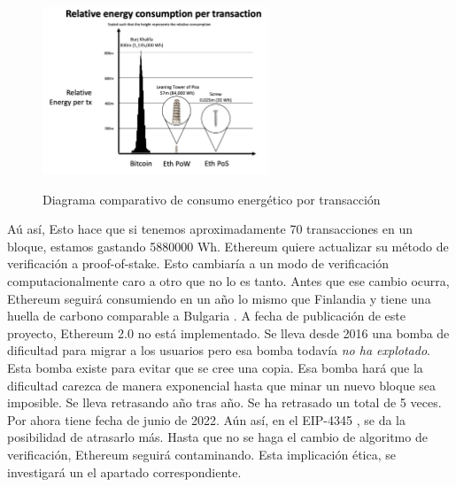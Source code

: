 \begin{figure}[h!]
    \centering
    \includegraphics[width=0.6\textwidth]{Figures/consumo.png}
    \caption{Diagrama comparativo de consumo energético por transacción}
    \label{fg:consumo}
    \cite{web:eth_energy}
\end{figure}
Aú así, Esto hace que si tenemos aproximadamente 70 transacciones en un bloque, estamos gastando 5880000 Wh.
Ethereum quiere actualizar su método de verificación a proof-of-stake. Esto cambiaría a un modo de verificación computacionalmente caro a otro que no lo es tanto. Antes que ese cambio ocurra, Ethereum seguirá consumiendo en un año lo mismo que Finlandia y tiene una huella de carbono comparable a Bulgaria \cite{web:carbono}.
A fecha de publicación de este proyecto, Ethereum 2.0 no está implementado. Se lleva desde 2016 una bomba de dificultad para migrar a los usuarios pero esa bomba todavía \textit{no ha explotado}. Esta bomba existe para evitar que se cree una copia. Esa bomba hará que la dificultad carezca de manera exponencial hasta que minar un nuevo bloque sea imposible. Se lleva retrasando año tras año. Se ha retrasado un total de 5 veces. Por ahora tiene fecha de junio de 2022. Aún así, en el EIP-4345 \cite{web:eip_bomb}, se da la posibilidad de atrasarlo más.
Hasta que no se haga el cambio de algoritmo de verificación, Ethereum seguirá contaminando. Esta implicación ética, se investigará un el apartado correspondiente.
